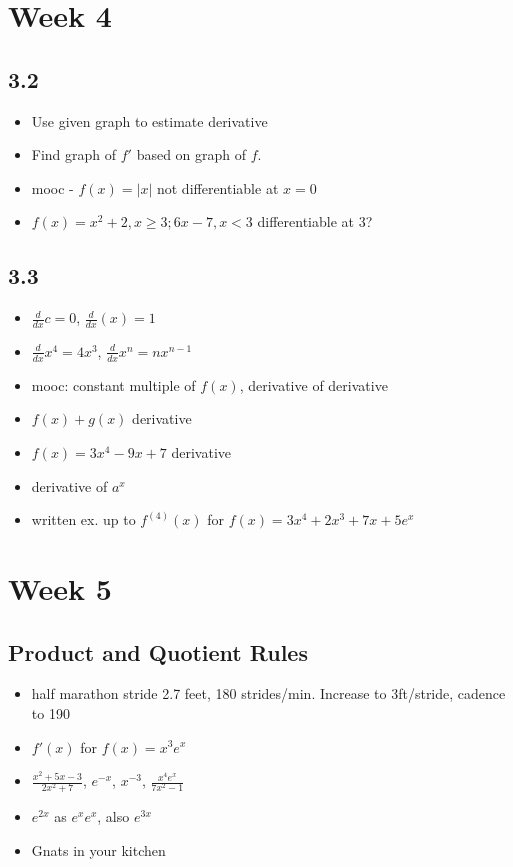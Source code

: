 \documentclass[11pt]{article}
\begin{document}
\section{Week 4}

\subsection{3.2}
\begin{itemize}
	\item Use given graph to estimate derivative
	\item Find graph of $f'$ based on graph of $f$.
	\item mooc - $f(x) = \vert x \vert$ not differentiable at $x = 0$
	\item $f(x) = x^2 + 2, x \geq 3; 6x-7, x < 3$ differentiable at 3?
\end{itemize}

\subsection{3.3}
\begin{itemize}
	\item $\frac{d}{dx} c = 0$, $\frac{d}{dx} (x) = 1$
	\item $\frac{d}{dx} x^4 = 4x^3$, $\frac{d}{dx} x^n = nx^{n-1}$
	\item mooc: constant multiple of $f(x)$, derivative of derivative
	\item $f(x) + g(x)$ derivative
	\item $f(x) = 3x^4 - 9x + 7$ derivative
	\item derivative of $a^x$
	\item written ex. up to $f^{(4)}(x)$ for $f(x) = 3x^4 + 2x^3 + 7x + 5e^x$
\end{itemize}

\section*{Week 5}

\subsection{Product and Quotient Rules}
\begin{itemize}
	\item half marathon stride 2.7 feet, 180 strides/min.  Increase to 3ft/stride, cadence to 190
	\item $f'(x)$ for $f(x) = x^3e^x$
	\item $\frac{x^2 + 5x - 3}{2x^2 + 7}$, $e^{-x}$, $x^{-3}$, $\frac{x^4e^x}{7x^2 -1 }$
	\item $e^{2x}$ as $e^x e^x$, also $e^{3x}$
	\item Gnats in your kitchen
\end{itemize}
\end{document}
